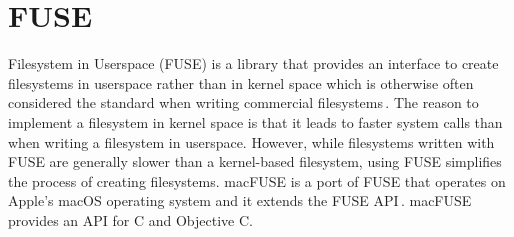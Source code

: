 \section{FUSE}
Filesystem in Userspace (FUSE) is a library that provides an interface to create filesystems in userspace rather than in kernel space which is otherwise often considered the standard when writing commercial filesystems\,\cite{Libfuse2021}. The reason to implement a filesystem in kernel space is that it leads to faster system calls than when writing a filesystem in userspace. However, while filesystems written with FUSE are generally slower than a kernel-based filesystem, using FUSE simplifies the process of creating filesystems. macFUSE is a port of FUSE that operates on Apple's macOS operating system and it extends the FUSE API\,\cite{HomeMacFUSE}. macFUSE provides an API for C and Objective C.